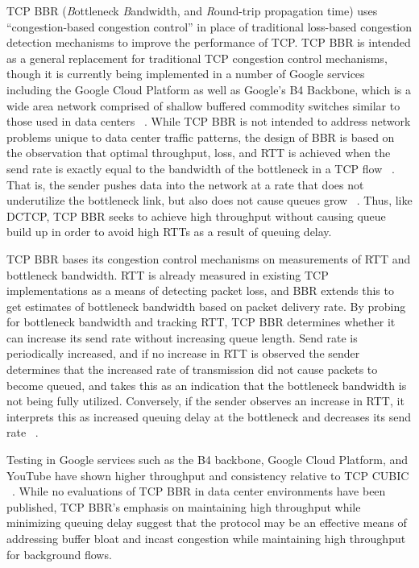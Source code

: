 TCP BBR (\emph{B}ottleneck \emph{B}andwidth, and \emph{R}ound-trip propagation time) uses ``congestion-based congestion control'' in place of traditional loss-based congestion detection mechanisms to improve the performance of TCP. TCP BBR is intended as a general replacement for traditional TCP congestion control mechanisms, though it is currently being implemented in a number of Google services including the Google Cloud Platform as well as Google's B4 Backbone, which is a wide area network comprised of shallow buffered commodity switches similar to those used in data centers ~\cite{cardwell_bbr:_2016, cardwell_tcp_2017}. While TCP BBR is not intended to address network problems unique to data center traffic patterns, the design of BBR is based on the observation that optimal throughput, loss, and RTT is achieved when the send rate is exactly equal to the bandwidth of the bottleneck in a TCP flow ~\cite{kleinrock_power_1979}. That is, the sender pushes data into the network at a rate that does not underutilize the bottleneck link, but also does not cause queues grow ~\cite{cardwell_bbr:_2016}. Thus, like DCTCP, TCP BBR seeks to achieve high throughput without causing queue build up in order to avoid high RTTs as a result of queuing delay.

TCP BBR bases its congestion control mechanisms on measurements of RTT and bottleneck bandwidth. RTT is already measured in existing TCP implementations as a means of detecting packet loss, and BBR extends this to get estimates of bottleneck bandwidth based on packet delivery rate. By probing for bottleneck bandwidth and tracking RTT, TCP BBR determines whether it can increase its send rate without increasing queue length. Send rate is periodically increased, and if no increase in RTT is observed the sender determines that the increased rate of transmission did not cause packets to become queued, and takes this as an indication that the bottleneck bandwidth is not being fully utilized. Conversely, if the sender observes an increase in RTT, it interprets this as increased queuing delay at the bottleneck and decreases its send rate ~\cite{cardwell_bbr:_2016}. 

Testing in Google services such as the B4 backbone, Google Cloud Platform, and YouTube have shown higher throughput and consistency relative to TCP CUBIC ~\cite{cardwell_bbr:_2016, cardwell_tcp_2017}. While no evaluations of TCP BBR in data center environments have been published, TCP BBR's emphasis on maintaining high throughput while minimizing queuing delay suggest that the protocol may be an effective means of addressing buffer bloat and incast congestion while maintaining high throughput for background flows.

